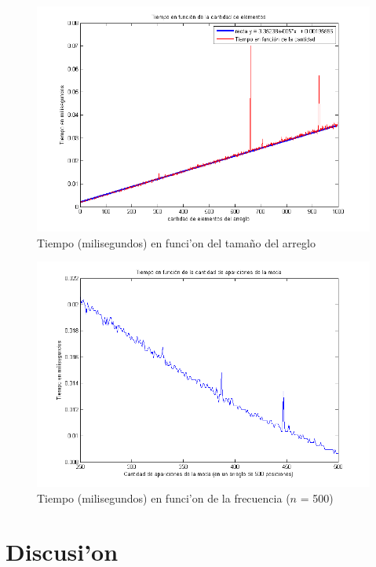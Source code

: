 \begin{figure}[H]
\centering
\includegraphics[scale=0.8]{../../codigo/ejercicio3/benchmark_de_tiempo/graficos/moda-1000-casos.png}
\caption{Tiempo (milisegundos) en funci'on del tama\~{n}o del arreglo}
\label{Ej3fig3}
\end{figure}

\begin{figure}[H]
\centering
\includegraphics[scale=0.8]{../../codigo/ejercicio3/benchmark_de_tiempo/graficos/aumento-frecuencia.png}
\caption{Tiempo (milisegundos) en funci'on de la frecuencia ($n$ = 500)}
\label{Ej3fig4}
\end{figure}

\newpage
\section{Discusi'on}
